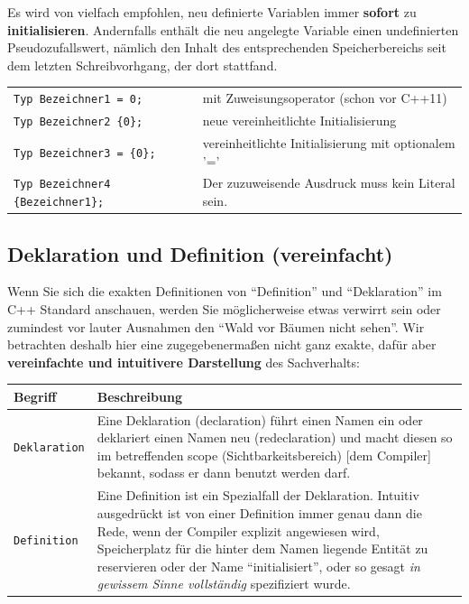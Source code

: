 \documentclass[a4paper]{report}
\begin{document}
Es wird von vielfach empfohlen, neu definierte Variablen immer \textbf{sofort} zu \textbf{initialisieren}. Andernfalls enthält die neu angelegte Variable einen undefinierten Pseudozufallswert, nämlich den Inhalt des entsprechenden Speicherbereichs seit dem letzten Schreibvorhgang, der dort stattfand.
\begin{center}
\begin{tabular}{|l|l|}
	\hline
	\texttt{Typ Bezeichner1 = 0;} & mit Zuweisungsoperator (schon vor C++11) \\
	\texttt{Typ Bezeichner2 \textrm{\{}0\textrm{\}};} & neue vereinheitlichte Initialisierung \\
	\texttt{Typ Bezeichner3 = \textrm{\{}0\textrm{\}};} & vereinheitlichte Initialisierung mit optionalem '=' \\
	\texttt{Typ Bezeichner4 \textrm{\{}Bezeichner1\textrm{\}};} & Der zuzuweisende Ausdruck muss kein Literal sein. \\
	\hline
\end{tabular}
\end{center}

\subsection{Deklaration und Definition (vereinfacht)}

Wenn Sie sich die exakten Definitionen von "`Definition"' und "`Deklaration"' im C++ Standard anschauen, werden Sie möglicherweise etwas verwirrt sein oder zumindest vor lauter Ausnahmen den "`Wald vor Bäumen nicht sehen"'. Wir betrachten deshalb hier eine zugegebenermaßen nicht ganz exakte, dafür aber \textbf{vereinfachte und intuitivere Darstellung} des Sachverhalts:

\begin{center}
\begin{tabular}{|p{3cm}|p{12cm}|}
	\hline
	\textbf{Begriff} & \textbf{Beschreibung} \\ \hline
	\texttt{Deklaration} & Eine Deklaration (declaration) führt einen Namen ein oder deklariert einen Namen neu (redeclaration) und macht diesen so im betreffenden scope (Sichtbarkeitsbereich) [dem Compiler] bekannt, sodass er dann benutzt werden darf. \\ \hline
	\texttt{Definition} & Eine Definition ist ein Spezialfall der Deklaration. Intuitiv ausgedrückt ist von einer Definition immer genau dann die Rede, wenn der Compiler explizit angewiesen wird, Speicherplatz für die hinter dem Namen liegende Entität zu reservieren oder der Name "`initialisiert"', oder so gesagt \textit{in gewissem Sinne vollständig} spezifiziert wurde. \\ \hline %
\end{tabular}
\end{center}
\end{document}
